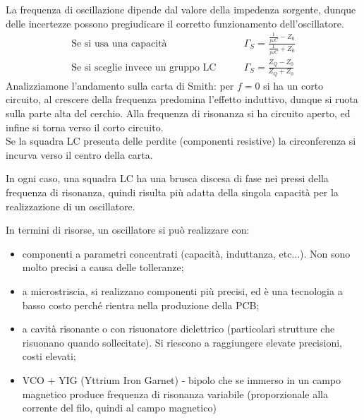 La frequenza di oscillazione dipende dal valore della impedenza sorgente, dunque delle incertezze possono pregiudicare il corretto funzionamento dell'oscillatore.
\begin{align*}
\mbox{Se si usa una capacità}
&
\qquad
\Gamma_S = \frac{\frac{1}{j\omega C} - Z_0}{\frac{1}{j\omega C} + Z_0}
\\
\mbox{Se si sceglie invece un gruppo LC}
&
\qquad
\Gamma_S = \frac{Z_Q - Z_0}{Z_Q + Z_0}
\end{align*}
%
%
%
%
%
%
%
%
%
Analizziamone l'andamento sulla carta di Smith: per $f=0$ si ha un corto circuito, al crescere della frequenza predomina l'effetto induttivo, dunque si ruota sulla parte alta del cerchio. Alla frequenza di risonanza si ha circuito aperto, ed infine si torna verso il corto circuito.\\
Se la squadra LC presenta delle perdite (componenti resistive) la circonferenza si incurva verso il centro della carta.
%
%

In ogni caso, una squadra LC ha una brusca discesa di fase nei pressi della frequenza di risonanza, quindi risulta più adatta della singola capacità per la realizzazione di un oscillatore.

In termini di risorse, un oscillatore si può realizzare con:
\begin{itemize}
	\item componenti a parametri concentrati (capacità, induttanza, etc...). Non sono molto precisi a causa delle tolleranze;
	\item a microstriscia, si realizzano componenti più precisi, ed è una tecnologia a basso costo perché rientra nella produzione della PCB;
	\item a cavità risonante o con risuonatore dielettrico (particolari strutture che risuonano quando sollecitate). Si riescono a raggiungere elevate precisioni, costi elevati;
	\item VCO + YIG (Yttrium Iron Garnet) - bipolo che se immerso in un campo magnetico produce frequenza di risonanza variabile (proporzionale alla corrente del filo, quindi al campo magnetico)
\end{itemize}

